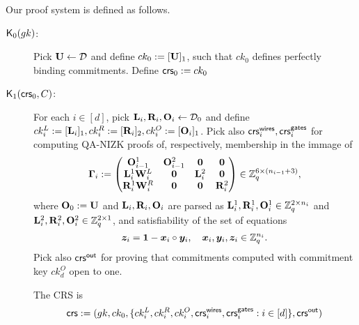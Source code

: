 Our proof system is defined as follows.
\begin{description}
\item[{$\mathsf{K}_0(gk)$}:] Pick $\mathbf{{U}}\gets\mathcal{D}$ and define $ck_0 := [\mathbf{{U}}]_1$, such that $ck_0$ defines perfectly binding commitments. Define $\mathsf{crs}_0 := ck_0$
\item[{$\mathsf{K}_1(\mathsf{crs}_0, C)$}:]
For each $i\in[d]$,
pick $\mathbf{{L}}_i,\mathbf{{R}}_i,\mathbf{{O}}_i\gets\mathcal{D}_0$ and define $ck^{L}_i := [\mathbf{{L}}_i]_1,ck^{R}_i := [\mathbf{{R}}_i]_2,ck^O_i:=[\mathbf{{O}}_i]_1$. Pick also $\mathsf{crs}^\mathsf{wires}_i,\mathsf{crs}^\mathsf{gates}_i$ for computing QA-NIZK proofs of, respectively, membership in the immage of
\begin{equation}
\mathbf{{\Gamma}}_i :=
\begin{pmatrix}
\mathbf{{O}}^1_{i-1}  & \mathbf{{O}}^2_{i-1}  & {\boldsymbol{0}}       & {\boldsymbol{0}}\\
\mathbf{{L}}^1_i\mathbf{{W}}^L_i         & {\boldsymbol{0}}         & \mathbf{{L}}^2_i & {\boldsymbol{0}} \\
\mathbf{{R}}^1_i\mathbf{{W}}^R_i         & {\boldsymbol{0}}         & {\boldsymbol{0}}      & \mathbf{{R}}^2_i
\end{pmatrix}\in\mathbb{Z}_q^{6\times (n_{i-1}+3)},
\end{equation}
where $\mathbf{{O}}_0 := \mathbf{{U}}$ and $\mathbf{{L}}_i,\mathbf{{R}}_i,\mathbf{{O}}_i$ are parsed as $\mathbf{{L}}^1_i,\mathbf{{R}}^1_i,\mathbf{{O}}^1_i\in\mathbb{Z}_q^{2\times n_i}$ and $\mathbf{{L}}^2_i,\mathbf{{R}}^2_i,\mathbf{{O}}^2_i\in\mathbb{Z}_q^{2\times 1}$, and satisfiability of the set of equations
\begin{equation}
{\boldsymbol{z}}_i = {\boldsymbol{1}} - {\boldsymbol{x}}_i\circ{\boldsymbol{y}}_i,\quad {\boldsymbol{x}}_i,{\boldsymbol{y}}_i,{\boldsymbol{z}}_i\in\mathbb{Z}_q^{n_i}.
\end{equation}
Pick also $\mathsf{crs}^\mathsf{out}$ for proving that commitments computed with commitment key $ck_d^O$ open to one.

The CRS is
$$\mathsf{crs} := (gk,ck_0,\{ck^L_i,ck^R_i,ck^O_i,\mathsf{crs}^\mathsf{wires}_i,\mathsf{crs}^\mathsf{gates}_i:i\in[d]\},\mathsf{crs}^\mathsf{out})$$


\end{description}
